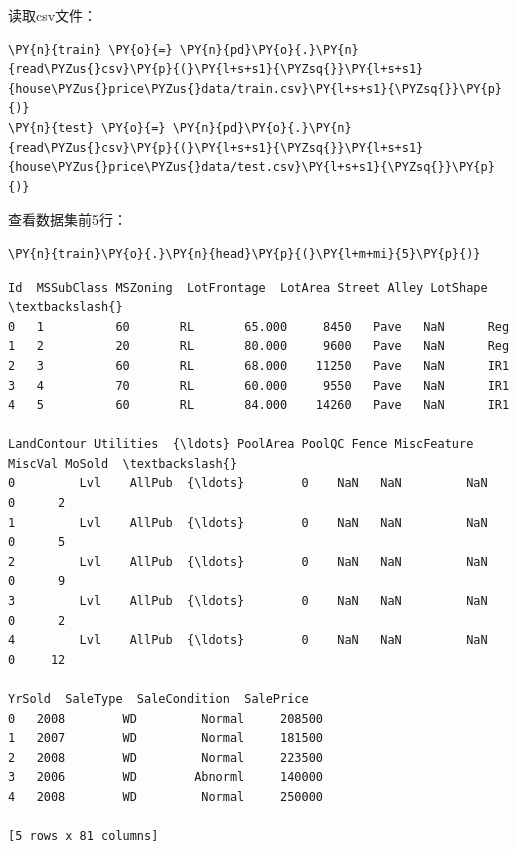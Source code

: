\documentclass[no-math]{YangThesis}
\begin{document}
读取csv文件：

\begin{tcolorbox}[breakable, size=fbox, boxrule=1pt, pad at break*=1mm,colback=cellbackground, colframe=cellborder]
	\begin{Verbatim}[commandchars=\\\{\}]
\PY{n}{train} \PY{o}{=} \PY{n}{pd}\PY{o}{.}\PY{n}{read\PYZus{}csv}\PY{p}{(}\PY{l+s+s1}{\PYZsq{}}\PY{l+s+s1}{house\PYZus{}price\PYZus{}data/train.csv}\PY{l+s+s1}{\PYZsq{}}\PY{p}{)}
\PY{n}{test} \PY{o}{=} \PY{n}{pd}\PY{o}{.}\PY{n}{read\PYZus{}csv}\PY{p}{(}\PY{l+s+s1}{\PYZsq{}}\PY{l+s+s1}{house\PYZus{}price\PYZus{}data/test.csv}\PY{l+s+s1}{\PYZsq{}}\PY{p}{)}
	\end{Verbatim}
\end{tcolorbox}

查看数据集前5行：

\begin{tcolorbox}[breakable, size=fbox, boxrule=1pt, pad at break*=1mm,colback=cellbackground, colframe=cellborder]
	\begin{Verbatim}[commandchars=\\\{\}]
\PY{n}{train}\PY{o}{.}\PY{n}{head}\PY{p}{(}\PY{l+m+mi}{5}\PY{p}{)}
	\end{Verbatim}
\end{tcolorbox}

\begin{tcolorbox}[breakable, size=fbox, boxrule=.5pt, pad at break*=1mm, opacityfill=0]
	\begin{Verbatim}[commandchars=\\\{\}]
Id  MSSubClass MSZoning  LotFrontage  LotArea Street Alley LotShape  \textbackslash{}
0   1          60       RL       65.000     8450   Pave   NaN      Reg
1   2          20       RL       80.000     9600   Pave   NaN      Reg
2   3          60       RL       68.000    11250   Pave   NaN      IR1
3   4          70       RL       60.000     9550   Pave   NaN      IR1
4   5          60       RL       84.000    14260   Pave   NaN      IR1

LandContour Utilities  {\ldots} PoolArea PoolQC Fence MiscFeature MiscVal MoSold  \textbackslash{}
0         Lvl    AllPub  {\ldots}        0    NaN   NaN         NaN       0      2
1         Lvl    AllPub  {\ldots}        0    NaN   NaN         NaN       0      5
2         Lvl    AllPub  {\ldots}        0    NaN   NaN         NaN       0      9
3         Lvl    AllPub  {\ldots}        0    NaN   NaN         NaN       0      2
4         Lvl    AllPub  {\ldots}        0    NaN   NaN         NaN       0     12

YrSold  SaleType  SaleCondition  SalePrice
0   2008        WD         Normal     208500
1   2007        WD         Normal     181500
2   2008        WD         Normal     223500
3   2006        WD        Abnorml     140000
4   2008        WD         Normal     250000

[5 rows x 81 columns]
	\end{Verbatim}
\end{tcolorbox}
\end{document}
